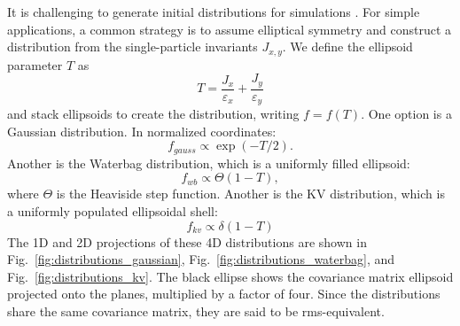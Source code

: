 It is challenging to generate initial distributions for simulations \cite{Lund2009}. For simple applications, a common strategy is to assume elliptical symmetry and construct a distribution from the single-particle invariants $J_{x,y}$. We define the ellipsoid parameter $T$ as 
%
\begin{equation}
    T = \frac{J_x}{\varepsilon_x} + \frac{J_y}{\varepsilon_y}
\end{equation}
%
and stack ellipsoids to create the distribution, writing $f = f(T)$. One option is a Gaussian distribution. In normalized coordinates:
%
\begin{equation}
    f_{gauss} \propto \exp(-T/2).
\end{equation}
%
Another is the Waterbag distribution, which is a uniformly filled ellipsoid:
%
\begin{equation}
    f_{wb} \propto \Theta(1 - T),
\end{equation}
%
where $\Theta$ is the Heaviside step function. Another is the KV distribution, which is a uniformly populated ellipsoidal shell:
%
\begin{equation}
    f_{kv} \propto \delta(1 - T)
\end{equation}
%
The 1D and 2D projections of these 4D distributions are shown in Fig.~\ref{fig:distributions_gaussian}, Fig.~\ref{fig:distributions_waterbag}, and Fig.~\ref{fig:distributions_kv}. The black ellipse shows the covariance matrix ellipsoid projected onto the planes, multiplied by a factor of four. Since the distributions share the same covariance matrix, they are said to be rms-equivalent.
%
